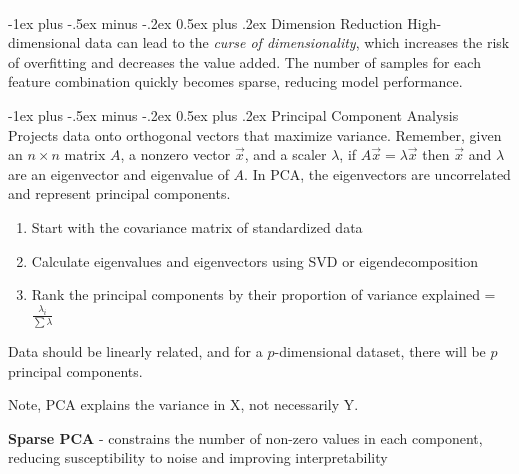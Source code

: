 \documentclass[10pt,landscape]{article}
\makeatletter
\renewcommand{\section}{\@startsection{section}{1}{0mm}%
                                {-1ex plus -.5ex minus -.2ex}%
                                {0.5ex plus .2ex}%
                                {\normalfont\large\bfseries}}
\renewcommand{\subsection}{\@startsection{subsection}{2}{0mm}%
                                {-1ex plus -.5ex minus -.2ex}%
                                {0.5ex plus .2ex}%
                                {\normalfont\normalsize\bfseries}}
\makeatother
\begin{document}
\begin{multicols}{3}
    \columnbreak
    \textcolor{white}{.}\vspace{-5mm}\\ %
    \section{Dimension Reduction}
    High-dimensional data can lead to the \emph{curse of dimensionality}, which increases the risk of overfitting and decreases the value added. The number of samples for each feature combination quickly becomes sparse, reducing model performance.

    \subsection{Principal Component Analysis}
    Projects data onto orthogonal vectors that maximize variance.
    Remember, given an $n\times n$ matrix $A$, a nonzero vector $\vec{x}$, and a scaler $\lambda$, if $A\vec{x} = \lambda \vec{x}$ then $\vec{x}$ and $\lambda$ are an eigenvector and eigenvalue of $A$. In PCA, the eigenvectors are uncorrelated and represent principal components.
    \begin{enumerate}[leftmargin=5mm]
        \itemsep -.4mm
        \item Start with the covariance matrix of standardized data
        \item Calculate eigenvalues and eigenvectors using SVD or eigendecomposition
        \item Rank the principal components by their proportion of variance explained = $\frac{\lambda_i}{\sum{\lambda}}$
    \end{enumerate}

    Data should be linearly related, and for a $p$-dimensional dataset, there will be $p$ principal components.

    Note, PCA explains the variance in X, not necessarily Y.

    \textbf{Sparse PCA} - constrains the number of non-zero values in each component, reducing susceptibility to noise and improving interpretability

\end{multicols}
\end{document}
